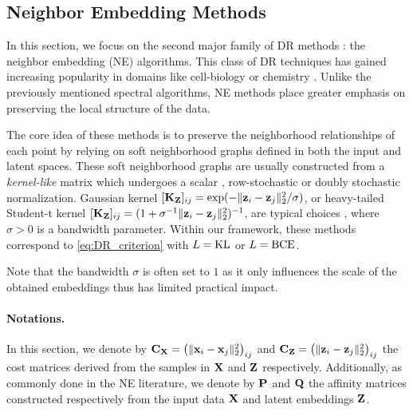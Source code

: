 \subsection{Neighbor Embedding Methods}\label{sec:neighbor_embedding}

In this section, we focus on the second major family of DR methods : the neighbor embedding (NE) algorithms. This class of DR techniques has gained increasing popularity in domains like cell-biology \citep{kobak2019art} or chemistry \citep{mai2022machine}. Unlike the previously mentioned spectral algorithms, NE methods place greater emphasis on preserving the local structure of the data.

The core idea of these methods is to preserve the neighborhood relationships of each point by relying on soft neighborhood graphs defined in both the input and latent spaces. These soft neighborhood graphs are usually constructed from a \emph{kernel-like} matrix which undergoes a scalar \citep{van2008visualizing}, row-stochastic \citep{hinton2002stochastic} or doubly stochastic \citep{lu2019doubly,van2023snekhorn} normalization. Gaussian kernel $[{\mathbf{K}}_{\mathbf{Z}}]_{ij} = \exp(-\|{\mathbf{z}}_i-{\mathbf{z}}_j\|_2^2 / \sigma)$, or heavy-tailed Student-t kernel $[{\mathbf{K}}_{\mathbf{Z}}]_{ij} = (1+\sigma^{-1}\|{\mathbf{z}}_i-{\mathbf{z}}_j\|_2^2)^{-1}$, are typical choices \citep{van2008visualizing}, where $\sigma > 0$ is a bandwidth parameter.
Within our framework, these methods correspond to \cref{eq:DR_criterion} with $L = \operatorname{KL}$ or $L=\operatorname{BCE}$.

\begin{remark}
    Note that the bandwidth $\sigma$ is often set to $1$ as it only influences the scale of the obtained embeddings thus has limited practical impact.
\end{remark}

\paragraph{Notations.}
In this section, we denote by $\mathbf{C}_{\mathbf{X}} = \left(\|{\mathbf{x}}_{i}-{\mathbf{x}}_{j}\|_2^2\right)_{ij}$ and $\mathbf{C}_{\mathbf{Z}} = \left(\|{\mathbf{z}}_{i}-{\mathbf{z}}_{j}\|_2^2\right)_{ij}$ the cost matrices derived from the samples in $\mathbf{X}$ and $\mathbf{Z}$ respectively. Additionally, as commonly done in the NE literature, we denote by ${\mathbf{P}}$ and ${\mathbf{Q}}$ the affinity matrices constructed respectively from the input data ${\mathbf{X}}$ and latent embeddings ${\mathbf{Z}}$.

